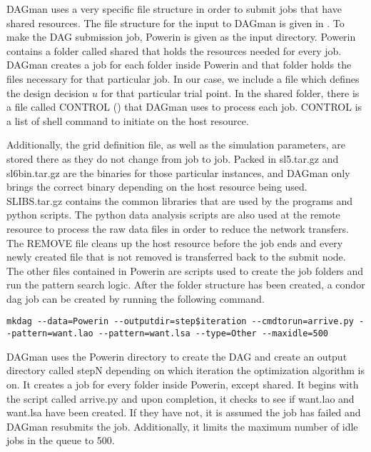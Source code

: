 DAGman uses a very specific file structure in order to submit jobs that have shared resources.  The file structure for the input to DAGman is given in .  To make the DAG submission job, Powerin is given as the input directory.  Powerin contains a folder called shared that holds the resources needed for every job.  DAGman creates a job for each folder inside Powerin and that folder holds the files necessary for that particular job.  In our case, we include a  file which defines the design decision $u$ for that particular trial point.  In the shared folder, there is a file called CONTROL () that DAGman uses to process each job.  CONTROL is a list of shell command to initiate on the host resource. 
\linespread{1}

\linespread{2}
 Additionally, the grid definition file, as well as the simulation parameters, are stored there as they do not change from job to job.  Packed in sl5.tar.gz and sl6bin.tar.gz are the binaries for those particular instances, and DAGman only brings the correct binary depending on the host resource being used.  SLIBS.tar.gz contains the common libraries that are used by the programs and python scripts.  The python data analysis scripts are also used at the remote resource to process the raw data files in order to reduce the network transfers.  The REMOVE file cleans up the host resource before the job ends and every newly created file that is not removed is transferred back to the submit node.  The other files contained in Powerin are scripts used to create the job folders and run the pattern search logic.  After the folder structure has been created, a condor dag job can be created by running the following command.
\begin{lstlisting}
mkdag --data=Powerin --outputdir=step$iteration --cmdtorun=arrive.py --pattern=want.lao --pattern=want.lsa --type=Other --maxidle=500
\end{lstlisting}
DAGman uses the Powerin directory to create the DAG and create an output directory called stepN depending on which iteration the optimization algorithm is on.  It creates a job for every folder inside Powerin, except shared.  It begins with the script called arrive.py and upon completion, it checks to see if want.lao and want.lsa have been created.  If they have not, it is assumed the job has failed and DAGman resubmits the job.  Additionally, it limits the maximum number of idle jobs in the queue to 500.

